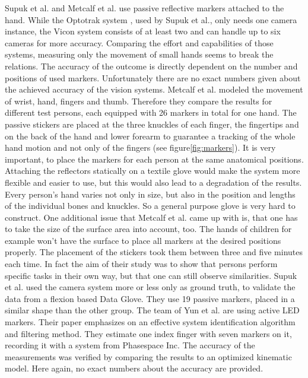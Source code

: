 Supuk et al. \cite{supuk2008evaluation} and Metcalf et al. \cite{metcalf2008validation} use passive reflective markers attached to the hand. While the Optotrak system \cite{optotrak}, used by Supuk et al., only needs one camera instance, the Vicon system \cite{vicon} consists of at least two and can handle up to six cameras for more accuracy. Comparing the effort and capabilities of those systems, measuring only the movement of small hands seems to break the relations. The accuracy of the outcome is directly dependent on the number and positions of used markers. Unfortunately there are no exact numbers given about the achieved accuracy of the vision systems. Metcalf et al. modeled the movement of wrist, hand, fingers and thumb. Therefore they compare the results for different test persons, each equipped with 26 markers in total for one hand. The passive stickers are placed at the three knuckles of each finger, the fingertips and on the back of the hand and lower forearm to guarantee a tracking of the whole hand motion and not only of the fingers (see figure\ref{fig:markers}). It is very important, to place the markers for each person at the same anatomical positions. Attaching the reflectors statically on a textile glove would make the system more flexible and easier to use, but this would also lead to a degradation of the results. Every person's hand varies not only in size, but also in the position and lengths of the individual bones and knuckles. So a general purpose glove is very hard to construct. One additional issue that Metcalf et al. came up with is, that one has to take the size of the surface area into account, too. The hands of children for example won't have the surface to place all markers at the desired positions properly. The placement of the stickers took them between three and five minutes each time. In fact the aim of their study was to show that persons perform specific tasks in their own way, but that one can still observe similarities. Supuk et al. used the camera system more or less only as ground truth, to validate the data from a flexion based Data Glove. They use 19 passive markers, placed in a similar shape than the other group. The team of Yun et al. are using active LED markers. Their paper emphasizes on an effective system identification algorithm and filtering method. They estimate one index finger with seven markers on it, recording it with a system from Phasespace Inc. The accuracy of the measurements was verified by comparing the results to an optimized kinematic model. Here again, no exact numbers about the accuracy are provided.\\
